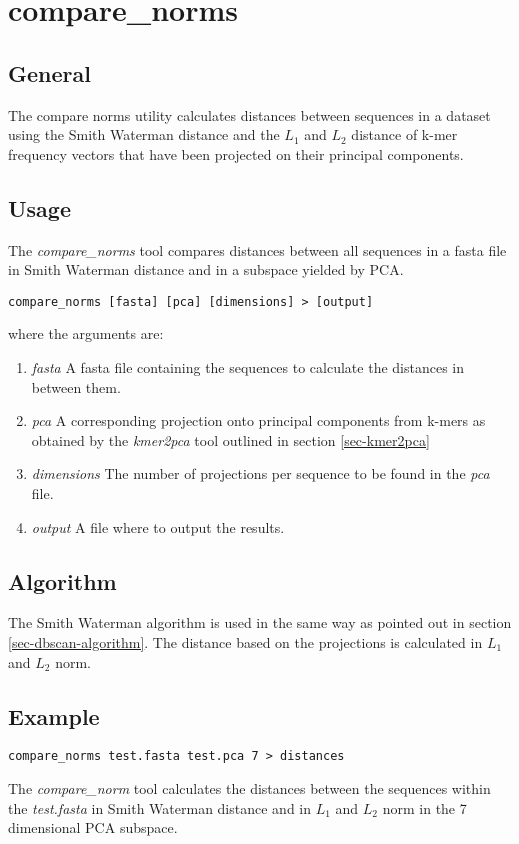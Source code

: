 \section{compare\_norms}

\subsection{General}

The compare norms utility calculates distances between sequences
in a dataset using the Smith Waterman distance and the $L_{1}$ and $L_{2}$
distance of k-mer frequency vectors that have been projected on their
principal components.

\subsection{Usage}

The \emph{compare\_norms} tool compares distances between all
sequences in a fasta file in Smith Waterman distance and in a subspace
yielded by PCA. 

\begin{lstlisting}
compare_norms [fasta] [pca] [dimensions] > [output]
\end{lstlisting}
where the arguments are:
\begin{enumerate}
  \item \emph{fasta} A fasta file containing the sequences to
    calculate the distances in between them.
  \item \emph{pca} A corresponding projection onto principal
    components from k-mers as obtained by the \emph{kmer2pca} tool
    outlined in section \ref{sec-kmer2pca}
  \item \emph{dimensions} The number of projections per sequence to be
    found in the \emph{pca} file.
  \item \emph{output} A file where to output the results.
\end{enumerate}

\subsection{Algorithm}
The Smith Waterman algorithm is used in the same way as pointed out in
section \ref{sec-dbscan-algorithm}. The distance based on the
projections is calculated in $L_1$ and $L_2$ norm.

\subsection{Example}
\begin{lstlisting}
compare_norms test.fasta test.pca 7 > distances
\end{lstlisting}
The \emph{compare\_norm} tool calculates the distances between the
sequences within the \emph{test.fasta} in Smith Waterman distance and
in $L_1$ and $L_2$ norm in the 7 dimensional PCA subspace.

